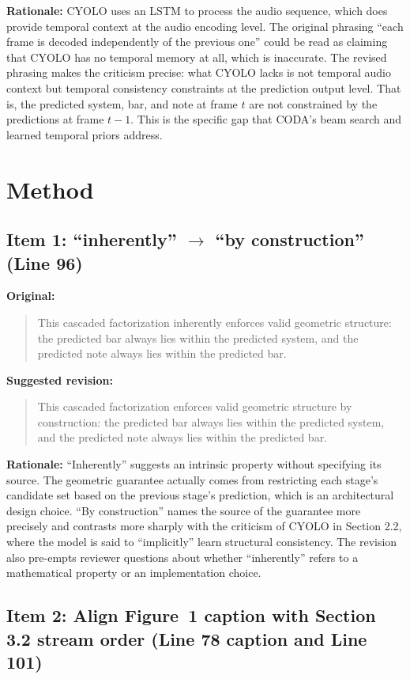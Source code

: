 \documentclass{article}
\begin{document}
\textbf{Rationale:}
CYOLO uses an LSTM to process the audio sequence, which does provide temporal context at the audio encoding level. The original phrasing ``each frame is decoded independently of the previous one'' could be read as claiming that CYOLO has no temporal memory at all, which is inaccurate. The revised phrasing makes the criticism precise: what CYOLO lacks is not temporal audio context but temporal consistency constraints at the prediction output level. That is, the predicted system, bar, and note at frame $t$ are not constrained by the predictions at frame $t{-}1$. This is the specific gap that CODA's beam search and learned temporal priors address.

\section*{Method}

\subsection*{Item 1: ``inherently'' $\to$ ``by construction'' (Line 96)}

\textbf{Original:}
\begin{quote}
This cascaded factorization inherently enforces valid geometric structure: the predicted bar always lies within the predicted system, and the predicted note always lies within the predicted bar.
\end{quote}

\textbf{Suggested revision:}
\begin{quote}
This cascaded factorization enforces valid geometric structure by construction: the predicted bar always lies within the predicted system, and the predicted note always lies within the predicted bar.
\end{quote}

\textbf{Rationale:}
``Inherently'' suggests an intrinsic property without specifying its source. The geometric guarantee actually comes from restricting each stage's candidate set based on the previous stage's prediction, which is an architectural design choice. ``By construction'' names the source of the guarantee more precisely and contrasts more sharply with the criticism of CYOLO in Section 2.2, where the model is said to ``implicitly'' learn structural consistency. The revision also pre-empts reviewer questions about whether ``inherently'' refers to a mathematical property or an implementation choice.

\subsection*{Item 2: Align Figure~1 caption with Section 3.2 stream order (Line 78 caption and Line 101)}
\end{document}
